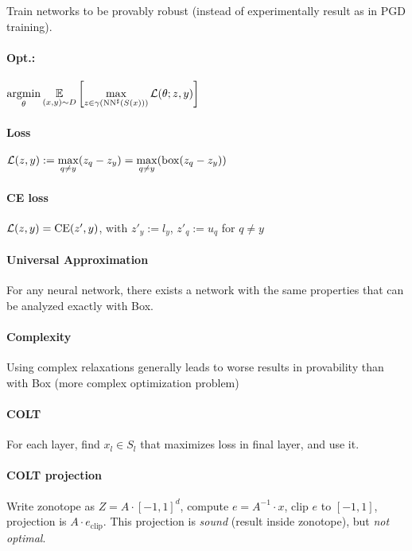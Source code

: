 Train networks to be provably robust (instead of experimentally result as in PGD training). 

\paragraph{Opt.:} 
$\displaystyle \operatorname*{argmin}_\theta \operatorname*{\mathbb{E}}_{(x, y) \sim D} \left[ \max_{z \in \gamma(\operatorname{NN}^{\sharp}(S(x)))} \operatorname{\mathcal{L}}(\theta; z, y)\right]$

\paragraph{Loss} $\displaystyle \operatorname{\mathcal{L}}(z, y) := \max_{q \neq y} (z_q - z_y) = \max_{q \neq y} (\operatorname{box}(z_q - z_y))$

\paragraph{CE loss} $\operatorname{\mathcal{L}}(z, y) = \operatorname{CE}(z', y)$, with $z'_y := l_y$, $z'_q := u_q$ for $q \neq y$ 

\paragraph{Universal Approximation} For any neural network, there exists a network with the same properties that can be analyzed exactly with Box. 

\paragraph{Complexity} Using complex relaxations generally leads to worse results in provability than with Box (more complex optimization problem)

\paragraph{COLT} For each layer, find $x_l \in S_l$ that maximizes loss in final layer, and use it. 

\paragraph{COLT projection} Write zonotope as $Z = A \cdot [-1, 1]^d$, compute $e = A^{-1}\cdot x$, clip $e$ to $[-1, 1]$, projection is $A\cdot e_\text{clip}$. 
This projection is \emph{sound} (result inside zonotope), but \emph{not optimal}. 